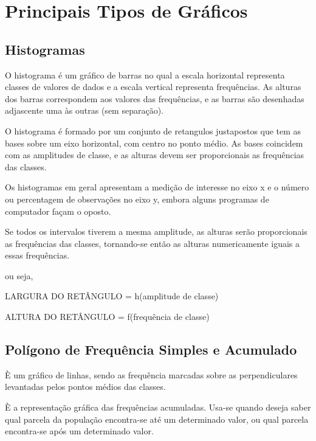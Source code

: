 
\section{Principais Tipos de Gráficos}

\subsection{Histogramas}

\inic O histograma é um gráfico de barras no qual a escala horizontal representa classes de valores de dados e a escala vertical representa frequências. As alturas dos barras correspondem aos valores das frequências, e as barras são desenhadas adjascente uma às outras (sem separação).
 \vskip0.3cm
 
\inic O histograma é formado por um conjunto de retangulos justapostos
que tem as bases sobre um eixo horizontal, com centro no ponto
médio. As bases coincidem com as amplitudes de classe, e as
alturas devem ser proporcionais as frequências das
classes.
\vskip0.3cm 
 

\inic Os histogramas em geral apresentam a medição de interesse no eixo
x e o número ou percentagem de observações no eixo y, embora
alguns programas de computador façam o oposto. 
\vskip0.3cm

Se todos os intervalos tiverem a mesma amplitude, as alturas serão
proporcionais as frequências das classes, tornando-se então as
alturas numericamente iguais a essas frequências.\vskip0.3cm

ou seja,\vskip0.3cm

LARGURA DO RETÂNGULO = h(amplitude de classe)

ALTURA DO RETÂNGULO = f(frequência de classe)




\subsection{Polígono de Frequência Simples e Acumulado}

\inic È um gráfico de linhas, sendo as frequência marcadas sobre as
perpendiculares levantadas pelos pontos médios das classes.\vskip0.3cm

È a representação gráfica das frequências acumuladas. Usa-se
quando deseja saber qual parcela da população encontra-se até um
determinado valor, ou qual parcela encontra-se após um determinado
valor.\vskip0.3cm


